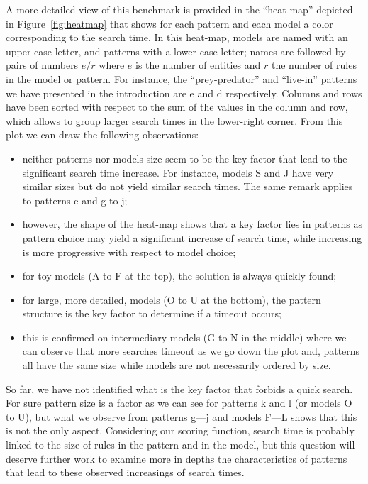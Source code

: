\documentclass[a4paper,twoside]{article}
\begin{document}
A more detailed view of this benchmark is provided in the ``heat-map'' depicted in Figure~\ref{fig:heatmap} that shows for each pattern and each model a color corresponding to the search time.
In this heat-map, models are named with an upper-case letter, and patterns with a lower-case letter; names are followed by pairs of numbers $e/r$ where $e$ is the number of entities and $r$ the number of rules in the model or pattern.
For instance, the ``prey-predator'' and ``live-in'' patterns we have presented in the introduction are \textsf{e} and \textsf{d} respectively.
Columns and rows have been sorted with respect to the sum of the values in the column and row, which allows to group larger search times in the lower-right corner.
From this plot we can draw the following observations:
%
\begin{itemize}
\item neither patterns nor models size seem to be the key factor that lead to the significant search time increase. For instance, models \textsf{S} and \textsf{J} have very similar sizes but do not yield similar search times. The same remark applies to patterns \textsf{e} and \textsf{g} to \textsf{j};
\item however, the shape of the heat-map shows that a key factor lies in patterns as pattern choice may yield a significant increase of search time, while increasing is more progressive with respect to model choice;
\item for toy models (\textsf{A} to \textsf{F} at the top), the solution is always quickly found;
\item for large, more detailed, models (\textsf{O} to \textsf{U} at the bottom), the pattern structure is the key factor to determine if a timeout occurs;
\item this is confirmed on intermediary models (\textsf{G} to \textsf{N} in the middle) where we can observe that more searches timeout as we go down the plot and, patterns all have the same size while models are not necessarily ordered by size.
\end{itemize}
%
So far, we have not identified what is the key factor that forbids a quick search.
For sure pattern size is a factor as we can see for patterns \textsf{k} and \textsf{l} (or models \textsf{O} to \textsf{U}), but what we observe from patterns \textsf{g}---\textsf{j} and models \textsf{F}---\textsf{L} shows that this is not the only aspect.
Considering our scoring function, search time is probably linked to the size of rules in the pattern and in the model, but this question will deserve further work to examine more in depths the characteristics of patterns that lead to these observed increasings of search times.
\end{document}
